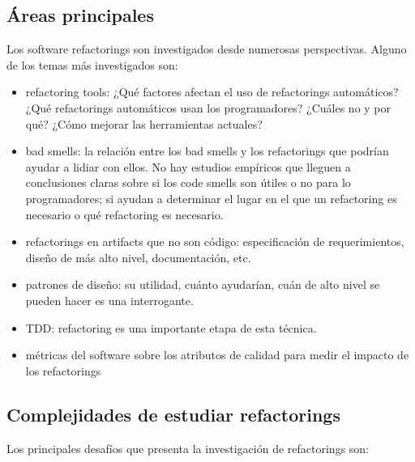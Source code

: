 \subsection{Áreas principales}
Los software refactorings son investigados desde numerosas perspectivas. Alguno de los temas más
investigados son:

\begin{itemize}
    \item refactoring tools: ¿Qué factores afectan el uso de refactorings automáticos? ¿Qué
refactorings automáticos usan los programadores? ¿Cuáles no y por qué? ¿Cómo mejorar las
herramientas actuales?
    \item bad smells: la relación entre los bad smells y los refactorings que podrían ayudar a
lidiar con ellos. No hay estudios empíricos que lleguen a conclusiones claras sobre si los code
smells son útiles o no para lo programadores; si ayudan a determinar el lugar en el que un
refactoring es necesario o qué refactoring es necesario.
    \item refactorings en artifacts que no son código: especificación de requerimientos, diseño de
    más alto nivel, documentación, etc.
    \item patrones de diseño: su utilidad, cuánto ayudarían, cuán de alto nivel se pueden hacer es
    una interrogante.
    \item TDD: refactoring es una importante etapa de esta técnica.
    \item métricas del software sobre los atributos de calidad para medir el impacto de los
refactorings  
\end{itemize}


\subsection{Complejidades de estudiar refactorings}
Los principales desafíos que presenta la investigación de refactorings son:

